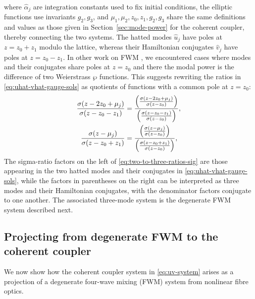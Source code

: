 \documentclass[11pt,a4paper]{article}
\numberwithin{equation}{section}
\begin{document}
where $\hat{\alpha}_{j}$ are integration constants used to fix initial conditions, the elliptic functions use invariants $g_2, g_3$, and $\mu_1, \mu_2, z_0, z_1, g_2, g_3$ share the same definitions and values as those given in Section~\ref{sec:mode-power} for the coherent coupler, thereby connecting the two systems. 
The hatted modes $\hat{u}_j$ have poles at $z=z_0+z_1$ modulo the lattice, whereas their Hamiltonian conjugates $\hat{v}_j$ have poles at $z=z_0-z_1$. 
In other work on FWM \cite{heskethCompleteWeierstrassElliptic2026}, we encountered cases where modes and their conjugates share poles at $z=z_0$ and there the modal power is the difference of two Weierstrass $\wp$ functions. 
This suggests rewriting the ratios in \eqref{eq:uhat-vhat-gauge-sols} as quotients of functions with a common pole at $z=z_0$:
\begin{align}
  \frac{ \sigma{\left(z - 2 z_{0} + {\mu}_{j}\right)} }{\sigma{\left(z - z_{0} - z_{1}\right)}} &= \frac{\left(\frac{\sigma{\left(z - 2 z_{0} + {\mu}_{j}\right)}}{\sigma{\left(z - z_{0}\right)}}\right)}{\left(\frac{\sigma{\left(z - z_{0} - z_{1}\right)}}{\sigma{\left(z - z_{0}\right)}}\right)}, \notag \\
  \frac{ \sigma{\left(z - {\mu}_{j}\right)} }{\sigma{\left(z - z_{0} + z_{1}\right)}} &= \frac{\left(\frac{\sigma{\left(z - {\mu}_{j}\right)}}{\sigma{\left(z - z_{0}\right)}}\right)}{\left(\frac{\sigma{\left(z - z_{0} + z_{1}\right)}}{\sigma{\left(z - z_{0}\right)}}\right)}, \label{eq:two-to-three-ratios-sig}
\end{align}
The sigma-ratio factors on the left of \eqref{eq:two-to-three-ratios-sig} are those appearing in the two hatted modes and their conjugates in \eqref{eq:uhat-vhat-gauge-sols}, while the factors in parentheses on the right can be interpreted as three modes and their Hamiltonian conjugates, with the denominator factors conjugate to one another.
The associated three-mode system is the degenerate FWM system described next.

\subsection{Projecting from degenerate FWM to the coherent coupler}\label{subsec:deg-fwm}
We now show how the coherent coupler system in \eqref{eq:uv-system} arises as a projection of a degenerate four-wave mixing (FWM) system from nonlinear fibre optics.
\end{document}
